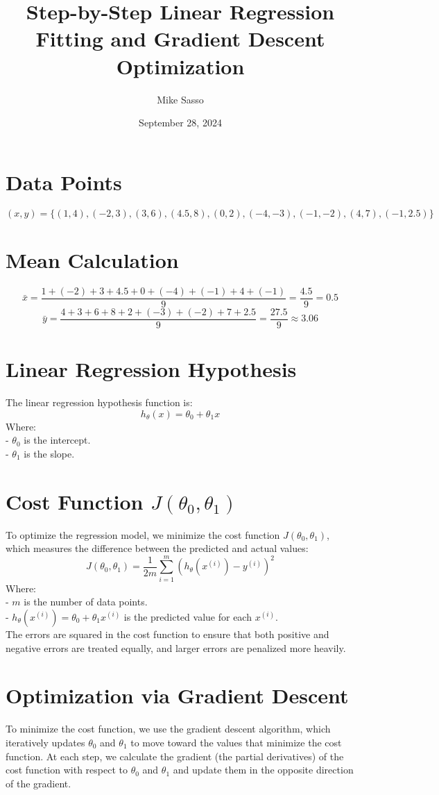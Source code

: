 \documentclass[12pt]{article}
\title{Step-by-Step Linear Regression Fitting and Gradient Descent Optimization}
\author{Mike Sasso}
\date{September 28, 2024}
\begin{document}
\maketitle

\newpage

\section*{Data Points}
\[
(x, y) = \{(1, 4), (-2, 3), (3, 6), (4.5, 8), (0, 2), (-4, -3), (-1, -2), (4, 7), (-1, 2.5)\}
\]

\section*{Mean Calculation}
\[
\bar{x} = \frac{1 + (-2) + 3 + 4.5 + 0 + (-4) + (-1) + 4 + (-1)}{9} = \frac{4.5}{9} = 0.5
\]
\[
\bar{y} = \frac{4 + 3 + 6 + 8 + 2 + (-3) + (-2) + 7 + 2.5}{9} = \frac{27.5}{9} \approx 3.06
\]

\section*{Linear Regression Hypothesis}
The linear regression hypothesis function is:
\[
h_\theta(x) = \theta_0 + \theta_1 x
\]
Where: \\
- \( \theta_0 \) is the intercept. \\
- \( \theta_1 \) is the slope.

\section*{Cost Function \( J(\theta_0, \theta_1) \)}
To optimize the regression model, we minimize the cost function \( J(\theta_0, \theta_1) \), which measures the difference between the predicted and actual values:
\[
J(\theta_0, \theta_1) = \frac{1}{2m} \sum_{i=1}^{m} \left( h_\theta(x^{(i)}) - y^{(i)} \right)^2
\]
Where: \\
- \( m \) is the number of data points. \\
- \( h_\theta(x^{(i)}) = \theta_0 + \theta_1 x^{(i)} \) is the predicted value for each \( x^{(i)} \).\vspace{0.5cm}
\\
The errors are squared in the cost function to ensure that both positive and negative errors are treated equally, and larger errors are penalized more heavily.

\section*{Optimization via Gradient Descent}
To minimize the cost function, we use the gradient descent algorithm, which iteratively updates \( \theta_0 \) and \( \theta_1 \) to move toward the values that minimize the cost function. At each step, we calculate the gradient (the partial derivatives) of the cost function with respect to \( \theta_0 \) and \( \theta_1 \) and update them in the opposite direction of the gradient.
\end{document}
